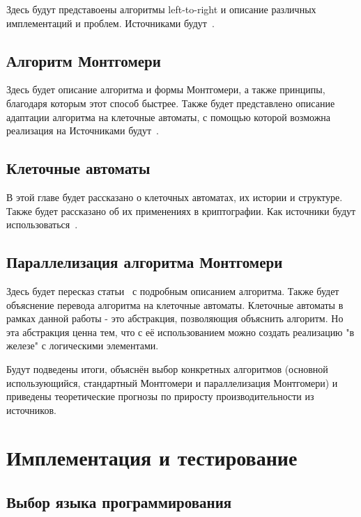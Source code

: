 \documentclass[times,specification,annotation]{itmo-student-thesis}
\begin{document}
Здесь будут представоены алгоритмы left-to-right и описание различных имплементаций и проблем.
Источниками будут~\cite{knu97, men01, koc97}.

\section{Алгоритм Монтгомери}\label{sec:mont}

Здесь будет описание алгоритма и формы Монтгомери, а также принципы, благодаря которым этот способ быстрее.
Также будет представлено описание адаптации алгоритма на клеточные автоматы, с помощью которой
возможна реализация на
Источниками будут~\cite{jeo07, men01, koc97}.

\section{Клеточные автоматы}\label{sec:cells}

В этой главе будет рассказано о клеточных автоматах, их истории и структуре.
Также будет рассказано об их применениях в криптографии.
Как источники будут использоваться~\cite{zhu17, zhu17_2}.

\section{Параллелизация алгоритма Монтгомери}\label{sec:paramont}

Здесь будет пересказ статьи~\cite{ku04} с подробным описанием алгоритма.
Также будет объяснение перевода алгоритма на клеточные автоматы.
Клеточные автоматы в рамках данной работы - это абстракция, позволяющия объяснить алгоритм.
Но эта абстракция ценна тем, что с её использованием можно создать реализацию "в железе" с логическими элементами.

\finishrelatedwork
\chapterconclusion

Будут подведены итоги, объяснён выбор конкретных алгоритмов (основной использующийся, стандартный
Монтгомери и параллелизация Монтгомери) и приведены теоретические прогнозы по приросту производительности
из источников.

\chapter{Имплементация и тестирование}

\section{Выбор языка программирования}\label{sec:prog}
\end{document}
